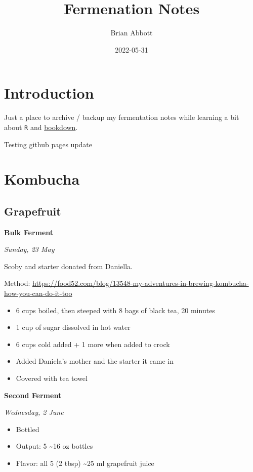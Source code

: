 \documentclass[
]{book}
\title{Fermenation Notes}
\author{Brian Abbott}
\date{2022-05-31}
\providecommand{\tightlist}{%
  \setlength{\itemsep}{0pt}\setlength{\parskip}{0pt}}
\begin{document}
\maketitle

{
\setcounter{tocdepth}{1}
\tableofcontents
}
\hypertarget{introduction}{%
\chapter{Introduction}\label{introduction}}

Just a place to archive / backup my fermentation notes while learning a bit about \texttt{R} and \href{https://bookdown.org/}{bookdown}.

Testing github pages update

\hypertarget{kombucha}{%
\chapter{Kombucha}\label{kombucha}}

\hypertarget{grapefruit}{%
\section{Grapefruit}\label{grapefruit}}

\textbf{Bulk Ferment}

\emph{Sunday, 23 May}

Scoby and starter donated from Daniella.

Method: \url{https://food52.com/blog/13548-my-adventures-in-brewing-kombucha-how-you-can-do-it-too}

\begin{itemize}
\item
  6 cups boiled, then steeped with 8 bags of black tea, 20 minutes
\item
  1 cup of sugar dissolved in hot water
\item
  6 cups cold added + 1 more when added to crock
\item
  Added Daniela's mother and the starter it came in
\item
  Covered with tea towel
\end{itemize}

\textbf{Second Ferment}

\emph{Wednesday, 2 June}

\begin{itemize}
\tightlist
\item
  Bottled
\item
  Output: 5 \textasciitilde16 oz bottles
\item
  Flavor: all 5 (2 tbsp) \textasciitilde25 ml grapefruit juice
\end{itemize}
\end{document}
